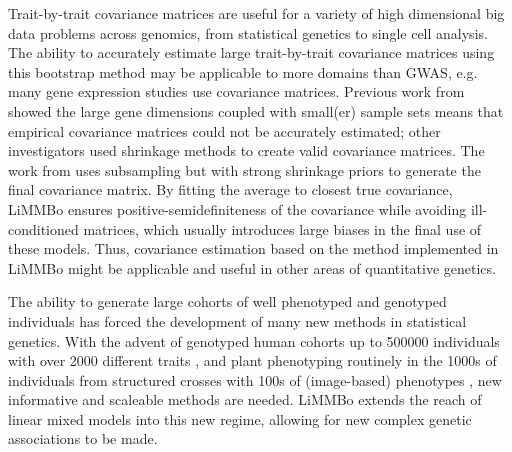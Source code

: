 Trait-by-trait covariance matrices are useful for a variety of high dimensional big data problems across genomics, from statistical genetics to single cell analysis. The ability to accurately estimate large trait-by-trait covariance matrices using this bootstrap method may be applicable to more domains than GWAS, e.g. many gene expression studies use covariance matrices. Previous work from \citet{Schaefer2005} showed the large gene dimensions coupled with small(er) sample sets means that empirical covariance matrices could not be accurately estimated; other investigators \citep{Ledoit2004,Furrer2007,Bickel2008} used shrinkage methods to create valid covariance matrices. The work from \citet{Teng2009} uses subsampling but with strong shrinkage priors to generate the final covariance matrix. By fitting the average to closest true covariance, LiMMBo ensures positive-semidefiniteness of the covariance while avoiding ill-conditioned matrices, which usually introduces large biases in the final use of these models. Thus, covariance estimation based on the method implemented in LiMMBo might be applicable and useful in other areas of quantitative genetics.  

The ability to generate large cohorts of well phenotyped and genotyped individuals has forced the development of many new methods in statistical genetics. With the advent of genotyped human cohorts up to \num{500000} individuals with over \num{2000} different traits \citep{Sudlow2015}, and plant phenotyping routinely in the \num{1000}s of individuals from structured crosses with \num{100}s of (image-based) phenotypes \citep{Atwell2010,Yang2014}, new informative and scaleable methods are needed. LiMMBo extends the reach of linear mixed models into this new regime, allowing for new complex genetic associations to be made.
